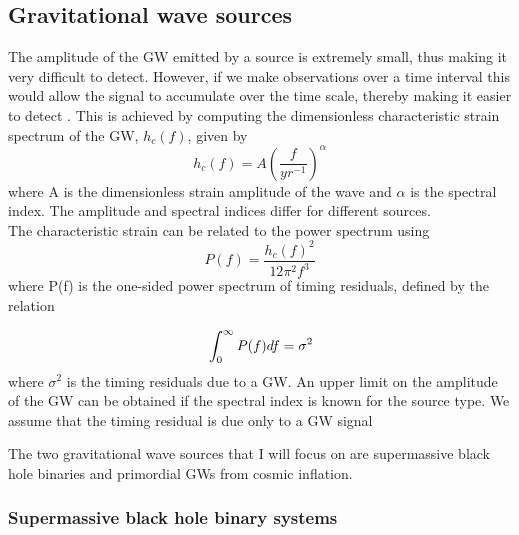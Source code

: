 \documentclass[12pt]{article}
\begin{document}
	
	
	\subsection{Gravitational wave sources}\label{GW sources}

The amplitude of the GW emitted by a source is extremely small, thus making it very difficult to detect. However, if we make observations over a time interval this would allow the signal to accumulate over the time scale, thereby making it easier to detect \cite{moore2014gravitational}. This is achieved by computing the dimensionless characteristic strain spectrum of the GW, $h_{c}(f)$, given by \cite{moore2014gravitational}
\begin{equation}\label{charac strain}
h_{c}(f)=A (\frac{f}{yr^{-1}})^{\alpha}
\end{equation}
where A is the dimensionless strain amplitude of the wave and $\alpha$ is the spectral index. The amplitude and spectral indices differ for different sources.\\
The characteristic strain can be related to the power spectrum using 
\begin{equation}\label{power spec}
P(f)=\frac{h_{c}(f)^2}{12 \pi^2 f^3}
\end{equation}
where P(f) is the one-sided power spectrum of timing residuals, defined by the relation

\begin{equation}{\label{power spectrum related to TOA}}
\int_{0}^{\infty}P(f)df=\sigma^2
\end{equation}
where $\sigma^2$ is the timing residuals due to a GW.
An upper limit on the amplitude of the GW can be obtained if the spectral index is known for the source type. We assume that the timing residual is due only to a GW signal 

The two gravitational wave sources that I will focus on are supermassive black hole binaries and primordial GWs from cosmic inflation.

\subsubsection{Supermassive black hole binary systems}\label{SMBHB source}
\end{document}

